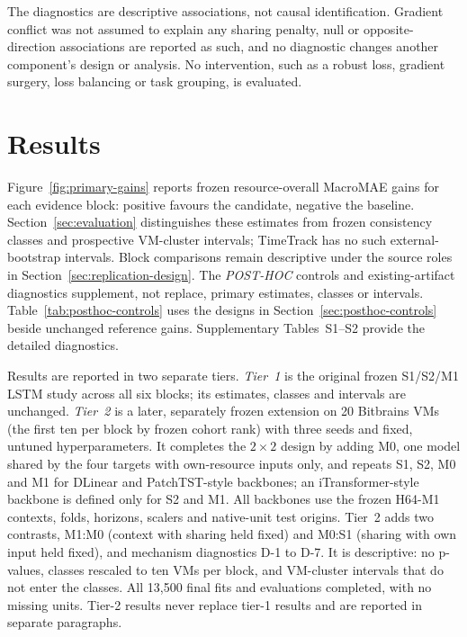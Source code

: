\documentclass[5p,twocolumn]{elsarticle}
\begin{document}
The diagnostics are descriptive associations, not causal identification.
Gradient conflict was not assumed to explain any sharing penalty, null or
opposite-direction associations are reported as such, and no diagnostic
changes another component's design or analysis. No intervention, such as a
robust loss, gradient surgery, loss balancing or task grouping, is evaluated.

\section{Results}

Figure~\ref{fig:primary-gains} reports frozen resource-overall MacroMAE gains
for each evidence block: positive favours the candidate, negative the baseline.
Section~\ref{sec:evaluation} distinguishes these estimates from frozen
consistency classes and prospective VM-cluster intervals; TimeTrack has no
such external-bootstrap intervals. Block comparisons remain descriptive under
the source roles in Section~\ref{sec:replication-design}.
The \emph{POST-HOC} controls and existing-artifact diagnostics supplement,
not replace, primary estimates, classes or intervals.
Table~\ref{tab:posthoc-controls} uses the designs in
Section~\ref{sec:posthoc-controls} beside unchanged reference gains.
Supplementary Tables~S1--S2 provide the detailed diagnostics.

Results are reported in two separate tiers. \emph{Tier~1} is the original
frozen S1/S2/M1 LSTM study across all six blocks; its estimates, classes and
intervals are unchanged. \emph{Tier~2} is a later, separately frozen
extension on 20 Bitbrains VMs (the first ten per block by frozen cohort rank)
with three seeds and fixed, untuned hyperparameters. It completes the
$2\times2$ design by adding M0, one model shared by the four targets with
own-resource inputs only, and repeats S1, S2, M0 and M1 for DLinear and
PatchTST-style backbones; an iTransformer-style backbone is defined only for
S2 and M1. All backbones use the frozen H64-M1 contexts, folds, horizons,
scalers and native-unit test origins. Tier~2 adds two contrasts,
M1:M0 (context with sharing held fixed) and M0:S1 (sharing with own input
held fixed), and mechanism diagnostics D-1 to D-7. It is descriptive: no
p-values, classes rescaled to ten VMs per block, and VM-cluster intervals
that do not enter the classes. All 13{,}500 final fits and evaluations
completed, with no missing units. Tier-2 results never replace tier-1
results and are reported in separate paragraphs.
\end{document}
